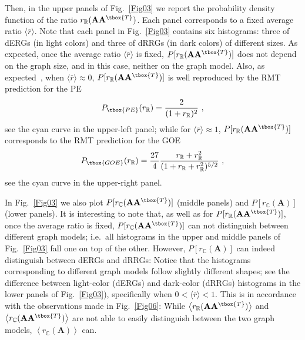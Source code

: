 Then, in the upper panels of Fig.~\ref{Fig03} we report the probability density function of the ratio 
$r_\mathbb{R}(\mathbf{A}\mathbf{A}^{\tbox{T}})$. Each panel corresponds to a fixed average ratio
$\langle \overline{r}\rangle$.
Note that each panel in Fig.~\ref{Fig03} contains six histograms: three of dERGs 
(in light colors) and three of dRRGs (in dark colors) of different sizes.
As expected, once the average ratio $\langle \overline{r}\rangle$ is fixed, 
$P[r_\mathbb{R}(\mathbf{A}\mathbf{A}^{\tbox{T}})]$
does not depend on the graph size, and in this case, neither on the graph model.
Also, as expected~\cite{KXOS23}, when $\langle \overline{r}\rangle\approx 0$, 
$P[r_\mathbb{R}(\mathbf{A}\mathbf{A}^{\tbox{T}})]$ is well reproduced by the RMT prediction for the
PE~\cite{ABGR13} 
\begin{equation}
P_{\tbox{PE}}(r_\mathbb{R}) = \frac{2}{(1+r_\mathbb{R})^2} \ ,
\label{PrPE}
\end{equation}
see the cyan curve in the upper-left panel;
while for $\langle \overline{r}\rangle\approx 1$, $P[r_\mathbb{R}(\mathbf{A}\mathbf{A}^{\tbox{T}})]$ 
corresponds to the RMT prediction for the GOE~\cite{ABGR13}
\begin{equation}
P_{\tbox{GOE}}(r_\mathbb{R}) = 
\frac{27}{4} \frac{r_\mathbb{R}+r_\mathbb{R}^2}{(1+r_\mathbb{R}+r_\mathbb{R}^2)^{5/2}} \ ,
\label{PrGOE}
\end{equation}
see the cyan curve in the upper-right panel.

In Fig.~\ref{Fig03} we also plot $P[r_\mathbb{C}(\mathbf{A}\mathbf{A}^{\tbox{T}})]$ (middle panels) 
and $P[r_\mathbb{C}(\mathbf{A})]$ (lower panels). It is interesting to note that, as well as 
for $P[r_\mathbb{R}(\mathbf{A}\mathbf{A}^{\tbox{T}})]$, once the average ratio is fixed, 
$P[r_\mathbb{C}(\mathbf{A}\mathbf{A}^{\tbox{T}})]$ can not distinguish between different graph
models; i.e.~all histograms in the upper and middle panels of Fig.~\ref{Fig03} fall one on top of the other.
However, $P[r_\mathbb{C}(\mathbf{A})]$ can indeed distinguish between dERGs and dRRGs: 
Notice that the histograms corresponding to different graph models
follow slightly different shapes; see the difference between light-color (dERGs) and dark-color (dRRGs) 
histograms in the lower panels of Fig.~\ref{Fig03}), specifically when $0<\langle \overline{r}\rangle<1$.
This is in accordance with the observations made in Fig.~\ref{Fig06}:
While $\left\langle r_\mathbb{R}(\mathbf{A}\mathbf{A}^{\tbox{T}}) \right\rangle$ and 
$\left\langle r_\mathbb{C}(\mathbf{A}\mathbf{A}^{\tbox{T}}) \right\rangle$ are not able to easily
distinguish between the two graph models, $\left\langle r_\mathbb{C}(\mathbf{A}) \right\rangle$ can.



